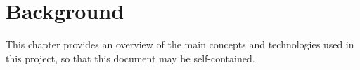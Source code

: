 \chapter{Background}
\label{chapter:background}

This chapter provides an overview of the main concepts and technologies used in
this project, so that this document may be self-contained.


